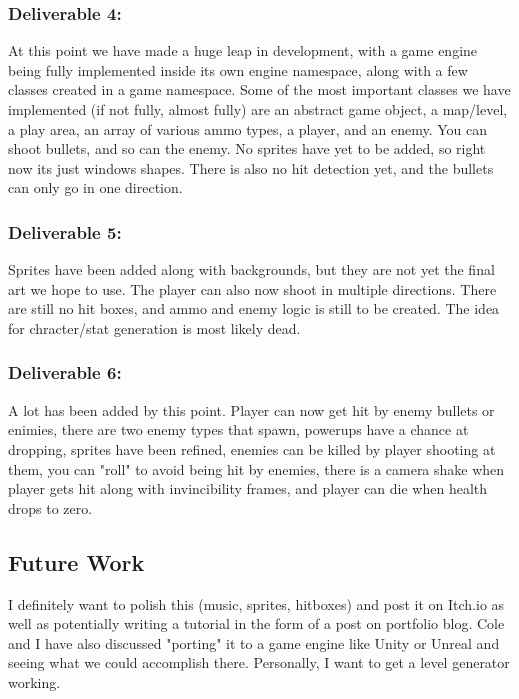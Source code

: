 \documentclass[10pt,conference,onecolumn,compsoc]{IEEEtran}
\begin{document}
\subsubsection*{Deliverable 4:} At this point we have made a huge leap in 
development, with 
a game engine being fully implemented inside its own engine
namespace, along with a few classes created in a game namespace. Some of 
the most important classes we have implemented (if not fully,
almost fully) are an abstract game object, a map/level, a play area, an array 
of various ammo types, a player, and an enemy. You can shoot
bullets, and so can the enemy. No sprites have yet to be added, so right now 
its just windows shapes. There is also no hit detection yet,
and the bullets can only go in one direction.

\subsubsection*{Deliverable 5:} Sprites have been added along with 
backgrounds, but they 
are not yet the final art we hope to use. The player can also now
shoot in multiple directions. There are still no hit boxes, and ammo and 
enemy logic is still to be created. The idea for chracter/stat
generation is most likely dead.

\subsubsection*{Deliverable 6:}A lot has been added by this point. Player 
can now get hit by 
enemy bullets or enimies, there are two enemy types that 
spawn, powerups have a chance at dropping, sprites have been refined, 
enemies can be killed by player shooting at them, you can "roll"
to avoid being hit by enemies, there is a camera shake when player gets hit 
along with invincibility frames, and player can die when
health drops to zero.

\subsection{Future Work}
I definitely want to polish this (music, sprites, hitboxes) and post it on Itch.io as well as potentially
writing a tutorial in the form of a post on portfolio blog. Cole and I have also discussed "porting" it to 
a game engine like Unity or Unreal and seeing what we could accomplish there. Personally, I want to get 
a level generator working. 


%
%
%
%
\end{document}
